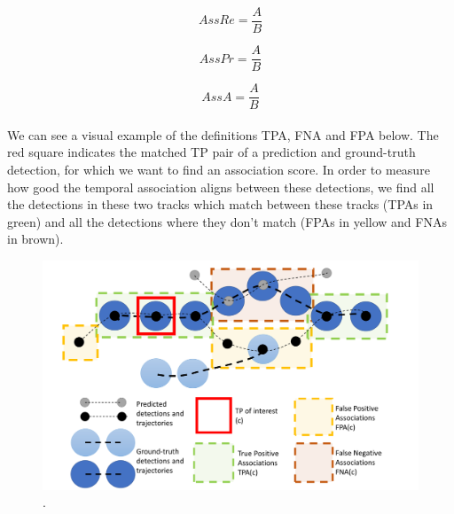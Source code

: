 \begingroup
\large
\begin{equation}
AssRe = \frac{A}{B}
\label{e:AssRe}
\end{equation}

\begin{equation}
AssPr = \frac{A}{B}
\label{e:AssPr}
\end{equation}

\begin{equation}
AssA = \frac{A}{B}
\label{e:AssA}
\end{equation}
\endgroup
\\
We can see a visual example of the definitions TPA, FNA and FPA below. The red square indicates the matched TP pair of a prediction and ground-truth detection, for which we want to find an association score. In order to measure how good the temporal association aligns between these detections, we find all the detections in these two tracks which match between these tracks (TPAs in green) and all the detections where they don’t match (FPAs in yellow and FNAs in brown).



\begin{figure}[ht]
    \centering
    \includegraphics[width=1\textwidth]{images/T/explanation.png}
    \caption{.}
    \label{img:road}
\end{figure}

